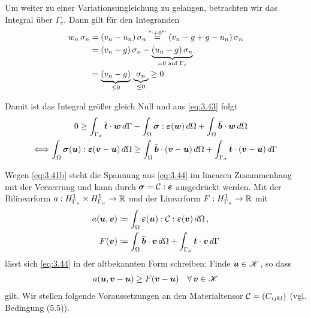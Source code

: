 Um weiter zu einer Variationsungleichung zu gelangen, betrachten wir das Integral über $\Gamma_c$. Dann gilt für den Integranden
\begin{align*}
	w_n \, \sigma_n &= (v_n - u_n) \, \sigma_n \stackrel{\scriptsize\text{"`}+0\text{"'}}= (v_n-g+g-u_n) \, \sigma_n  \\
	& =(v_n - g) \, \sigma_n - \underbrace{(u_n-g) \, \sigma_n}_{=0 \text{ auf } \Gamma_c} \\
	&  =\underbrace{ (v_n-g)}_{\le 0} \, \underbrace{\sigma_n}_{\le 0} \ge 0
\end{align*}


Damit ist das Integral größer gleich Null und aus \eqref{eq:3.43} folgt
\begin{align}\notag
	 0 \ge \int_{\Gamma_\sigma} \bar{\boldsymbol t} \cdot \boldsymbol w \, d\Gamma &-\int_\Omega \boldsymbol\sigma: \boldsymbol {\varepsilon}(\boldsymbol w) \, d\Omega + \int_\Omega \bar{\boldsymbol b} \cdot \boldsymbol w \, d\Omega \\
	\label{eq:3.44}
	\Longleftrightarrow \int_\Omega \boldsymbol\sigma(\boldsymbol u): \boldsymbol {\varepsilon}(\boldsymbol v - \boldsymbol u) \, d\Omega & \ge\int_\Omega \bar{\boldsymbol b} \cdot (\boldsymbol v-\boldsymbol u) \, d\Omega+ \int_{\Gamma_\sigma} \bar{\boldsymbol t} \cdot (\boldsymbol v-\boldsymbol u) \, d\Gamma 
\end{align}

Wegen \eqref{eq:3.41b} steht die Spannung aus \eqref{eq:3.44} im linearen Zusammenhang mit der Verzerrung und kann durch $\boldsymbol\sigma = \mathcal C : \boldsymbol{\varepsilon}$ ausgedrückt werden. Mit der Bilinearform $a: H^1_{\Gamma_u} \times H^1_{\Gamma_u} \rightarrow \mathbb{R}$ und der Linearform $F: H^1_{\Gamma_u} \rightarrow \mathbb{R}$ mit
\begin{subequations}
\begin{align}\label{eq:3.44a}
	a(\boldsymbol u,\boldsymbol v) &\coloneqq \int_\Omega \boldsymbol{\varepsilon} (\boldsymbol u) : \mathcal C : \boldsymbol{\varepsilon}(\boldsymbol v) \, d\Omega \, ,\\ 
	\label{eq:3.44b}
	 F(\boldsymbol v)& \coloneqq \int_\Omega \bar{\boldsymbol b} \cdot \boldsymbol v \, d\Omega + \int_{\Gamma_\sigma} \bar{\boldsymbol t} \cdot \boldsymbol v \, d\Gamma 
\end{align}
\end{subequations}
lässt sich \eqref{eq:3.44} in der altbekannten Form schreiben: Finde $\boldsymbol u \in \mathscr K$, so dass
\begin{align}\label{eq:3.45}
	a(\boldsymbol u, \boldsymbol v - \boldsymbol u) \ge F(\boldsymbol v- \boldsymbol u) \quad \forall \, \boldsymbol v \in \mathscr K 
\end{align}
gilt. Wir stellen folgende Voraussetzungen an den Materialtensor $\mathcal C = (C_{ijkl})$ (vgl. \cite{KikOden} Bedingung (5.5)).


